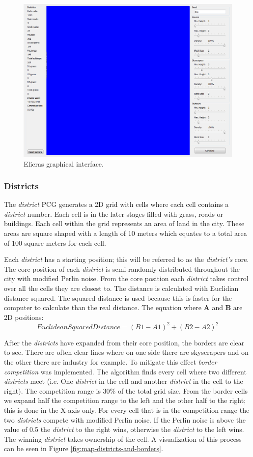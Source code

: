 		\begin{figure}[h]
			\centering
			\includegraphics[width=0.5\linewidth]{"Images/interface"}
			\caption{Elicras graphical interface.}
			\label{fig:elicras-interface}
		\end{figure}
		
		\subsubsection{Districts}
		The \textit{district} PCG generates a 2D grid with cells where each cell contains a \textit{district} number. Each cell is in the later stages filled with grass, roads or buildings. Each cell within the grid represents an area of land in the city. These areas are square shaped with a length of 10 meters which equates to a total area of 100 square meters for each cell.
		
		\par
		Each \textit{district} has a starting position; this will be referred to as the \textit{district's} core. The core position of each \textit{district} is semi-randomly distributed throughout the city with modified Perlin noise. From the core position each \textit{district} takes control over all the cells they are closest to. The distance is calculated with Euclidian distance squared. The squared distance is used because this is faster for the computer to calculate than the real distance. The equation where \textbf{A} and \textbf{B} are 2D positions:
		\begin{equation}
			EuclideanSquaredDistance = (B1 - A1)^2 + (B2 - A2)^2
		\end{equation}
		
		\par
		After the \textit{districts} have expanded from their core position, the borders are clear to see. There are often clear lines where on one side there are skyscrapers and on the other there are industry for example. To mitigate this effect \textit{border competition} was implemented. The algorithm finds every cell where two different \textit{districts} meet (i.e. One \textit{district} in the cell and another \textit{district} in the cell to the right). The competition range is 30\% of the total grid size. From the border cells we expand half the competition range to the left and the other half to the right; this is done in the X-axis only. For every cell that is in the competition range the two \textit{districts} compete with modified Perlin noise. If the Perlin noise is above the value of 0.5 the \textit{district} to the right wins, otherwise the \textit{district} to the left wins. The winning \textit{district} takes ownership of the cell. A visualization of this process can be seen in Figure \ref{fig:map-districts-and-borders}.
		
